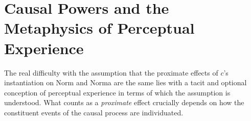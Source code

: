 \documentclass[12pt]{article}
\begin{document}

\section{Causal Powers and the Metaphysics of Perceptual Experience}\label{sec:intrinsic_and_extrinsic_powers} 

The real difficulty with the assumption that the proximate effects of $c$'s instantiation on Norm and Norma are the same lies with a tacit and optional conception of perceptual experience in terms of which the assumption is understood. What counts as a \emph{proximate} effect crucially depends on how the constituent events of the causal process are individuated.
\end{document}
